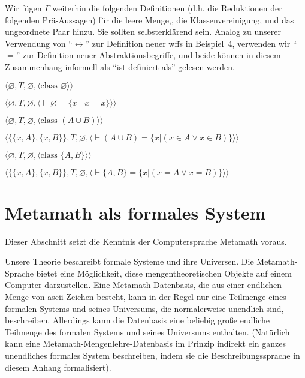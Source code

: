 Wir fügen $\Gamma$ weiterhin die folgenden Definitionen (d.h. die Reduktionen der folgenden Prä-Aussagen) für die leere Menge,, die Klassenvereinigung, und das ungeordnete Paar hinzu.  Sie sollten selbsterklärend sein.  Analog zu unserer Verwendung von "`$\leftrightarrow$"' zur Definition neuer wffs in Beispiel~4, verwenden wir "`$=$"' zur Definition neuer Abstraktionsbegriffe, und beide können in diesem Zusammenhang informell als "`ist definiert als"' gelesen werden. 
\begin{list}{}{\itemsep 0.0pt}
      \item[] $\langle\varnothing,T,\varnothing,
               \langle \mbox{class\ }\varnothing\rangle\rangle$
      \item[] $\langle\varnothing,T,\varnothing,
               \langle \vdash \varnothing = \{ x | \lnot x = x \}
               \rangle\rangle$
      \item[] $\langle\varnothing,T,\varnothing,
               \langle \mbox{class\ }(A\cup B)\rangle\rangle$
      \item[] $\langle\{\{x,A\},\{x,B\}\},T,\varnothing,
               \langle \vdash ( A \cup B ) = \{ x | ( x \in A \vee x \in B ) \}
               \rangle\rangle$
      \item[] $\langle\varnothing,T,\varnothing,
               \langle \mbox{class\ }\{A,B\}\rangle\rangle$
      \item[] $\langle\{\{x,A\},\{x,B\}\},T,\varnothing,
               \langle \vdash \{ A , B \} = \{ x | ( x = A \vee x = B ) \}
               \rangle\rangle$
\end{list}

\section{Metamath als formales System}\label{theorymm}

Dieser Abschnitt setzt die Kenntnis der Computersprache Metamath voraus.

Unsere Theorie beschreibt formale Systeme und ihre Universen.  Die Metamath-Sprache bietet eine Möglichkeit, diese mengentheoretischen Objekte auf einem Computer darzustellen.  Eine Metamath-Datenbasis, die aus einer endlichen Menge von {\sc ascii}-Zeichen besteht, kann in der Regel nur eine Teilmenge eines formalen Systems und seines Universums, die normalerweise unendlich sind, beschreiben.  Allerdings kann die Datenbasis eine beliebig große endliche Teilmenge des formalen Systems und seines Universums enthalten.  (Natürlich kann eine Metamath-Mengenlehre-Datenbasis im Prinzip indirekt ein ganzes unendliches formales System beschreiben, indem sie die Beschreibungssprache in diesem Anhang formalisiert). 

